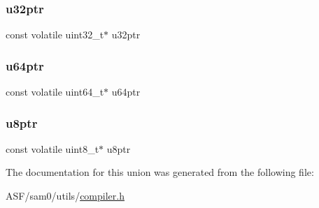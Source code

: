\subsubsection{\texorpdfstring{u32ptr}{u32ptr}}
{\footnotesize\ttfamily const volatile uint32\+\_\+t$\ast$ u32ptr}

\mbox{\label{union_union_c_v_ptr_a24a2bedaf12d427819c62babba34e2ef}} 
\subsubsection{\texorpdfstring{u64ptr}{u64ptr}}
{\footnotesize\ttfamily const volatile uint64\+\_\+t$\ast$ u64ptr}

\mbox{\label{union_union_c_v_ptr_ae6228fb5d646745079910ea045f314e3}} 
\subsubsection{\texorpdfstring{u8ptr}{u8ptr}}
{\footnotesize\ttfamily const volatile uint8\+\_\+t$\ast$ u8ptr}



The documentation for this union was generated from the following file\+:\begin{DoxyCompactItemize}
\item 
A\+S\+F/sam0/utils/\mbox{\hyperlink{compiler_8h}{compiler.\+h}}\end{DoxyCompactItemize}
